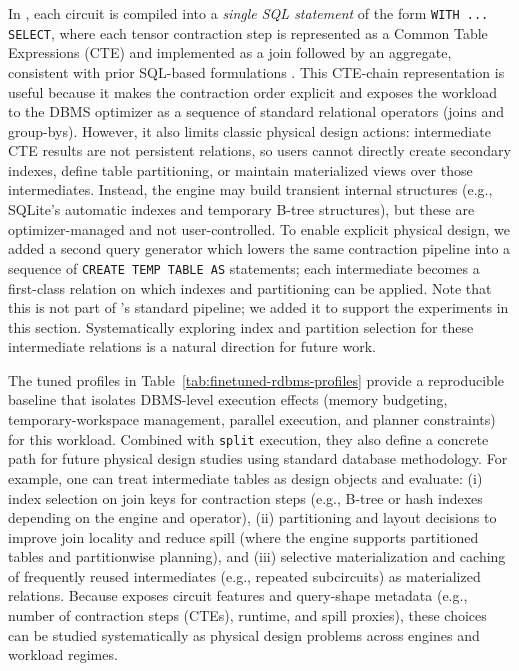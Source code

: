 In \sys, each circuit is compiled into a \emph{single SQL statement} of the form
\texttt{WITH ... SELECT}, where each tensor contraction step is represented as a Common Table Expressions (CTE) and
implemented as a join followed by an aggregate, consistent with prior SQL-based
formulations \cite{hai2025quantum, einsteinSQL2023}. This CTE-chain representation is
useful because it makes the contraction order explicit and exposes the workload to the
DBMS optimizer as a sequence of standard relational operators (joins and group-bys).
However, it also limits classic physical design actions: intermediate CTE results are
 not persistent relations, so users cannot directly create secondary indexes, define
table partitioning, or maintain materialized views over those intermediates. Instead, the
engine may build transient internal structures (e.g., SQLite's automatic indexes and temporary B-tree structures), but these are optimizer-managed and not user-controlled. To enable explicit
physical design, we added a second query generator which lowers the same contraction pipeline
into a sequence of \texttt{CREATE TEMP TABLE AS} statements; each intermediate becomes a
first-class relation on which indexes and partitioning can be applied. 
Note that this is not part of \sys's standard pipeline; we added it to support the
experiments in this section. Systematically exploring index and partition selection for
these intermediate relations is a natural direction for future work.
%

 

\medskip
{}
The tuned profiles in Table~\ref{tab:finetuned-rdbms-profiles} provide a reproducible
baseline that isolates DBMS-level execution effects (memory budgeting, temporary-workspace
management, parallel execution, and planner constraints) for this workload. Combined with
\texttt{split} execution, they also define a concrete path for future physical design
studies using standard database methodology. For example, one can treat intermediate
tables as design objects and evaluate: (i) index selection on join keys for contraction
steps (e.g., B-tree or hash indexes depending on the engine and operator), (ii)
partitioning and layout decisions to improve join locality and reduce spill (where the engine
supports partitioned tables and partitionwise planning), and (iii) selective
materialization and caching of frequently reused intermediates (e.g., repeated subcircuits)
as materialized relations. Because \sys exposes circuit features and query-shape metadata
(e.g., number of contraction steps (CTEs), runtime, and spill proxies), these choices can be
studied systematically as physical design problems across engines and workload regimes.

